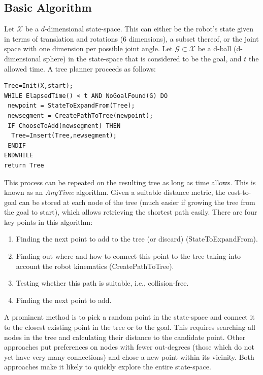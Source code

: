 \subsection{Basic Algorithm}
Let $ \mathcal{X}$ be a $ d$-dimensional state-space. This can either be the robot's state given in terms of translation and rotations (6 dimensions), a subset thereof, or the joint space with one dimension per possible joint angle. Let $ \mathcal{G} \subset \mathcal{X}$ be a  d-ball (d-dimensional sphere) in the state-space that is considered to be the goal, and $ t$ the allowed time. A tree planner proceeds as follows:

\begin{verbatim}
Tree=Init(X,start);
WHILE ElapsedTime() < t AND NoGoalFound(G) DO
 newpoint = StateToExpandFrom(Tree);
 newsegment = CreatePathToTree(newpoint);
 IF ChooseToAdd(newsegment) THEN
  Tree=Insert(Tree,newsegment);
 ENDIF
ENDWHILE
return Tree
\end{verbatim}

This process can be repeated on the resulting tree as long as time allows. This is known as an  \emph{AnyTime} algorithm. Given a suitable distance metric, the cost-to-goal can be stored at each node of the tree (much easier if growing the tree from the goal to start), which allows retrieving the shortest path easily. There are four key points in this algorithm:

\begin{enumerate}
\item Finding the next point to add to the tree (or discard) (StateToExpandFrom).
\item Finding out where and how to connect this point to the tree taking into account the robot kinematics (CreatePathToTree).
\item Testing whether this path is suitable, i.e., collision-free.
\item Finding the next point to add.
\end{enumerate}

A prominent method is to pick a random point in the state-space and connect it to the closest existing point in the tree or to the goal. This requires searching all nodes in the tree and calculating their distance to the candidate point. Other approaches put preferences on nodes with fewer out-degrees (those which do not yet have very many connections) and chose a new point within its vicinity. Both approaches make it likely to quickly explore the entire state-space.

